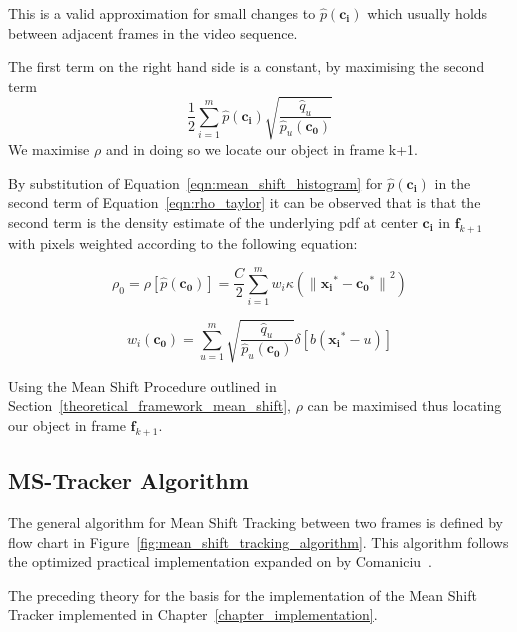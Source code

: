 This is a valid approximation for small changes to $\hat{p}(\mathbf{c_i})$
which usually holds between adjacent frames in the video sequence. 

The first term on the right hand side is a constant, by maximising the second
term 
\[\frac{1}{2}\sum_{i=1}^{m}\hat{p}(\mathbf{c_i})\sqrt{\frac{\hat{q}_u}{\hat{p}_u(\mathbf{c_0})}}\]
We maximise $\rho$ and in doing so we locate our object in frame k+1.

By substitution of Equation~\ref{eqn:mean_shift_histogram} for $\hat{p}(\mathbf{c_i})$ in
the second term of Equation~\ref{eqn:rho_taylor} it can be observed that is that the
second term is the density estimate of the underlying pdf at center
$\mathbf{c_i}$ in $\mathbf{f}_{k+1}$ with pixels weighted according to the
following equation:

\[\rho_0=\rho[\hat{p}(\mathbf{c_0})]=\frac{C}{2}\sum_{i=1}^{m}w_i\kappa({\parallel{\mathbf{x_i}^*}-{\mathbf{c_0}^*}\parallel}^2)\]

\begin{equation}\label{eqn:mean_shift_weights}
    w_i(\mathbf{c_0})=\sum_{u=1}^{m}\sqrt{\frac{\hat{q}_u}{\hat{p}_u(\mathbf{c_0})}}\delta[b(\mathbf{x_i}^*-u)]
\end{equation}

Using the Mean Shift Procedure outlined in Section~\ref{theoretical_framework_mean_shift}, $\rho$ can be maximised thus locating
our object in frame $\mathbf{f}_{k+1}$.

\subsection{MS-Tracker Algorithm}\label{theoretical_framework_mean_shift_algorithm}
The general algorithm for Mean Shift Tracking between two frames is defined by
flow chart in Figure~\ref{fig:mean_shift_tracking_algorithm}. This algorithm follows
the optimized practical implementation expanded on by Comaniciu~\cite{Comaniciu2003}. 


The preceding theory for the basis for the implementation of the Mean Shift
Tracker implemented in Chapter~\ref{chapter_implementation}.
